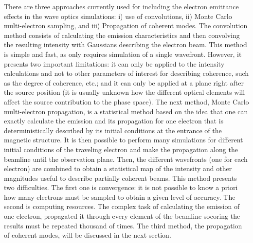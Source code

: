 \documentclass{iucr}              %
\begin{document}
There are three approaches currently used for including the electron emittance effects in the wave optics simulations: i) use of convolutions, ii) Monte Carlo multi-electron sampling, and iii) Propagation of coherent modes. The convolution method consists of calculating the emission characteristics and then convolving the resulting intensity with Gaussians describing the electron beam. This method is simple and fast, as only requires simulation of a single wavefront. However, it presents two important limitations: it can only be applied to the intensity calculations and not to other parameters of interest for describing coherence, such as the degree of coherence, etc.; and it can only be applied at a plane right after the source position (it is usually unknown how the different optical elements will affect the source contribution to the phase space). The next method, Monte Carlo multi-electron propagation, is a statistical method based on the idea that one can exactly calculate the emission and its propagation for one electron that is deterministically described by its initial conditions at the entrance of the magnetic structure. It is then possible to perform many simulations for different initial conditions of the traveling electron and make the propagation along the beamline until the observation plane. Then, the different wavefronts (one for each electron) are combined to obtain a statistical map of the intensity and other magnitudes useful to describe partially coherent beams. This method presents two difficulties. The first one is convergence: it is not possible to know a priori how many electrons must be sampled to obtain a given level of accuracy. The second is computing resources. The complex task of calculating the emission of one electron, propagated it through every element of the beamline socoring the results must be repeated thousand of times. The third method, the propagation of coherent modes, will be discussed in the next section. 
\end{document}
